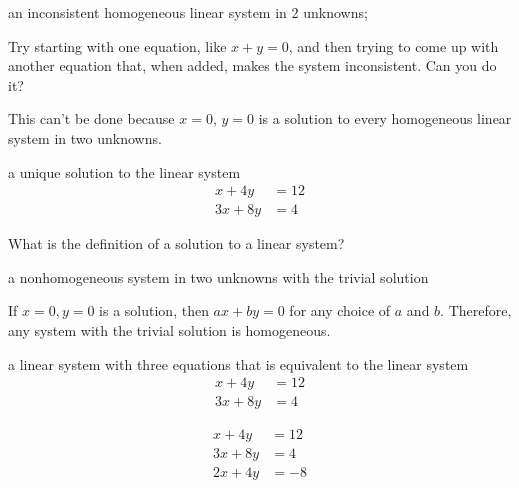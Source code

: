 \documentclass[hidelinks,12pt,handout]{ximera}
\begin{document}
\begin{exercise}
\begin{question}
an inconsistent homogeneous linear system in 2 unknowns;
\begin{hint} Try starting with one equation, like $x+y = 0$, and then trying to come up with another equation that, when added, makes the system inconsistent. Can you do it? \end{hint}
\vfill
	\begin{freeResponse}
			This can't be done because $x = 0$, $y = 0$ is a solution to every homogeneous linear system in two unknowns.
	\end{freeResponse}
\end{question}
\end{exercise}

\begin{question} a unique solution to the linear system 
	\begin{align*} x + 4 y &=  12 \\
				   3x + 8y &= 4
	\end{align*}\vfill
\begin{hint}
What is the definition of a solution to a linear system?
\end{hint}
\vfill
\begin{prompt}
\begin{multipleChoice}
\end{multipleChoice}
\end{prompt}
\end{question}


\begin{question}
a nonhomogeneous system in two unknowns with the trivial solution
\vfill
	\begin{freeResponse}
			If $x = 0, y = 0$ is a solution, then $ax + by = 0$ for any choice of $a$ and $b$.  Therefore, any system with the trivial solution is homogeneous.
	\end{freeResponse}
\end{question}

\begin{question} a linear system with three equations that is equivalent to the linear system
	\begin{align*} x + 4 y &= 12 \\
				   3x + 8y &= 4
	\end{align*}
	\vfill
		\begin{freeResponse}
			\begin{align*}x + 4 y &= 12 \\ 3x + 8y &= 4 \\ 2x + 4y &= -8 \end{align*}
	\end{freeResponse}
\end{question}
\end{document}
